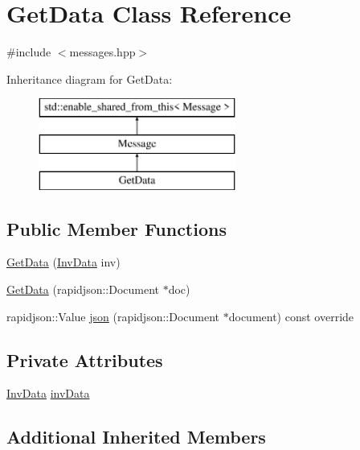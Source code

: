 \hypertarget{classGetData}{}\section{Get\+Data Class Reference}
\label{classGetData}


{\ttfamily \#include $<$messages.\+hpp$>$}

Inheritance diagram for Get\+Data\+:\begin{figure}[H]
\begin{center}
\leavevmode
\includegraphics[height=3.000000cm]{classGetData}
\end{center}
\end{figure}
\subsection*{Public Member Functions}
\begin{DoxyCompactItemize}
\item 
\mbox{\hyperlink{classGetData_adb9c8dc0c3f1e40329530b26bd96f32f}{Get\+Data}} (\mbox{\hyperlink{structInvData}{Inv\+Data}} inv)
\item 
\mbox{\hyperlink{classGetData_ab1179102b6e97c85834410f0699140f6}{Get\+Data}} (rapidjson\+::\+Document $\ast$doc)
\item 
rapidjson\+::\+Value \mbox{\hyperlink{classGetData_a2fb121264fc1c5821e769f4f2389c6ff}{json}} (rapidjson\+::\+Document $\ast$document) const override
\end{DoxyCompactItemize}
\subsection*{Private Attributes}
\begin{DoxyCompactItemize}
\item 
\mbox{\hyperlink{structInvData}{Inv\+Data}} \mbox{\hyperlink{classGetData_a964b166c01dbec2325e35a62f65e504c}{inv\+Data}}
\end{DoxyCompactItemize}
\subsection*{Additional Inherited Members}


